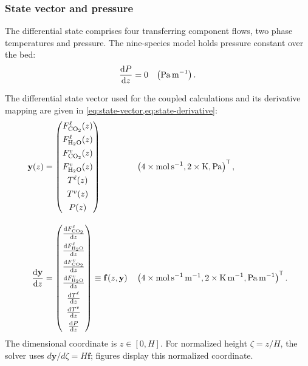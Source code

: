 \subsubsection{State vector and pressure}
The differential state comprises four transferring component flows, two phase temperatures and pressure.
The nine-species model holds pressure constant over the bed:
\begin{align}
\odv{\pressure}{z} = 0
&& \left(\unit{Pa\,m^{-1}}\right).
\end{align}

The differential state vector used for the coupled calculations and its derivative mapping are given in \cref{eq:state-vector,eq:state-derivative}:
\begin{align}
\mathbf{y}(z) &=
\begin{pmatrix}
\molarflow^{\liq}_{\COtwo}(z)\\[4pt]
\molarflow^{\liq}_{\HtwoO}(z)\\[4pt]
\molarflow^{\vap}_{\COtwo}(z)\\[4pt]
\molarflow^{\vap}_{\HtwoO}(z)\\[4pt]
\temperature^{\liq}(z)\\[4pt]
\temperature^{\vap}(z)\\[4pt]
\pressure(z)
\end{pmatrix}
&& \left(
4\times\unit{mol\,s^{-1}},
2\times\unit{K},
\unit{Pa}
\right)^{\mathsf{T}}\label{eq:state-vector},\\[1em]
\odv{\mathbf{y}}{z} &=
\begin{pmatrix}
\odv{\molarflow^{\liq}_{ \COtwo}}{z} \\[4pt]
\odv{\molarflow^{\liq}_{ \HtwoO}}{z} \\[4pt]
\odv{\molarflow^{\vap}_{ \COtwo}}{z} \\[4pt]
\odv{\molarflow^{\vap}_{ \HtwoO}}{z} \\[4pt]
\odv{\temperature^{\liq}}{z} \\[4pt]
\odv{\temperature^{\vap}}{z}\\[4pt]
\odv{\pressure}{z}
\end{pmatrix}
\equiv
\mathbf{f}(z, \mathbf{y})
&& \left(
4\times\unit{mol\,s^{-1}\,m^{-1}},
2\times\unit{K\,m^{-1}},
\unit{Pa\,m^{-1}}
\right)^{\mathsf{T}}.\label{eq:state-derivative}
\end{align}
The dimensional coordinate is $z\in[0,H]$.
For normalized height $\zeta=z/H$, the solver uses $d\mathbf y/d\zeta=H\mathbf f$; figures display this normalized coordinate.

